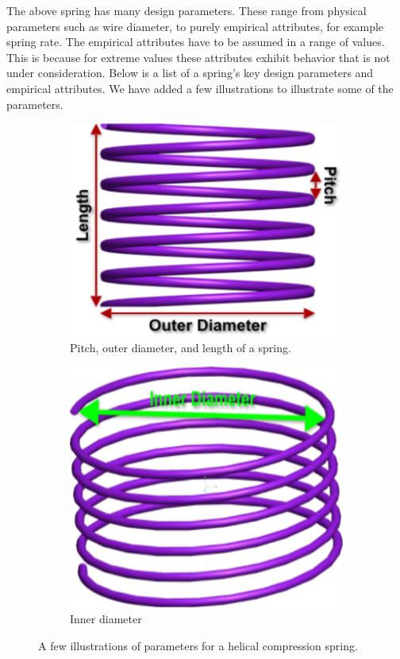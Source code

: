 \documentclass[10pt]{article}
\begin{document}
The above spring has many design parameters. These range from physical parameters such as wire diameter, to purely empirical attributes, for example spring rate. The empirical attributes have to be assumed in a range of values. This is because for extreme values these attributes exhibit behavior that is not under consideration. Below is a list of a spring's key design parameters and empirical attributes. We have added a few illustrations to illustrate some of the parameters. 		 
		\begin{figure}[h]
			\centering
			\begin{subfigure}{.5\textwidth}
				\includegraphics[scale=.2]{Spring_Description.png}
				\caption{Pitch, outer diameter, and length of a spring.}
				\label{Description1}
			\end{subfigure}%
			\begin{subfigure}{.5\textwidth}
				  \centering
		 		\includegraphics[scale=.2]{Spring_Description2.png}
				\caption{Inner diameter}
				  \label{Description2}
		  		
			\end{subfigure}
			 \label{Descriptions}
		  \caption{A few illustrations of parameters for a helical compression spring.}
		\end{figure}
		
\end{document}

